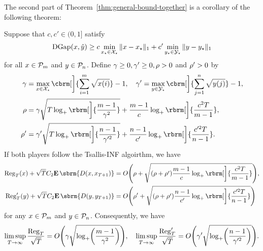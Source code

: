 The second part of Theorem~\ref{thm:general-bound-together}
is a corollary of the following theorem:
\begin{theorem}
	\label{thm:general-bound3}
    Suppose that $c, c'\in (0, 1]$ satisfy 
    \begin{align}
        \label{eq:LBDG}
        \operatorname{DGap}({x}, \hat{y})
        \ge
        c \min_{x_{\star} \in \mathcal{X}_{\star}}\| {x} - x_{\star} \|_1
        +
        c' \min_{y_{\star} \in \mathcal{Y}_{\star}} \| {y} - y_{\star}   \|_1
    \end{align}
    for all $x\in \mathcal{P}_m$ and $y \in \mathcal{P}_n$.
    Define
    $\gamma \ge 0, \gamma' \ge 0 , \rho > 0$ and
    $\rho' > 0$ by
    \begin{align}
        \label{eq:defgamma}
        \gamma
        &
        =
        \max_{x \in \NEr}
        \cbrm[\bigg]{
        \sum_{i = 1}^m
        \sqrt{x(i)}
        }
        -1
        ,
        \quad
        \gamma'
        =
        \max_{y \in \NEc}
        \cbrm[\bigg]{
        \sum_{j = 1}^n
        \sqrt{y(j)}
        }
        -1,
        \\
        \rhor 
        &
        = 
        \gamma\sqrt{T \log_+ \rbrm[\bigg]{ \frac{m-1}{\gamma^2} }} 
        +
        \frac{m-1}{c}
        \log_+\rbrm[\bigg]{
            \frac{c^2 T}{m-1}
        },
        \\
        \rhoc 
        &
        = 
        \gamma'\sqrt{T \log_+ \rbrm[\bigg]{\frac{n-1}{\gamma'^2} }} 
        +
        \frac{n-1}{c'}
        \log_+\rbrm[\bigg]{
            \frac{c'^2 T}{n-1}
        }.
    \end{align}
    If both players follow the Tsallis-INF algoirthm,
    we have
    \begin{align*}
    \Rr_T(x)
    +
    \sqrt{T}\constd{\E\sbrm{
        D(x, x_{T+1})
    }}
    &= O\mleft(\rhor + \sqrt{(\rhor + \rhoc)\frac{m-1}{c} \log_+ \rbrm[\bigg]{\frac{c^2T}{m-1} }}\mright),
    \\
    \Rc_T(y)
    +
    \sqrt{T}\constd{\E\sbrm{
        D(y, y_{T+1})
    }}
    &= O\mleft(\rhoc + \sqrt{(\rhor + \rhoc)\frac{n-1}{c'} \log_+ \rbrm[\bigg]{\frac{c'^2T}{n-1} }}\mright)
    \end{align*}
    for any $x \in \mathcal{P}_m$ and $y \in \mathcal{P}_n$.
    Consequently,
    we have
    \begin{align*}
        \limsup_{T \to \infty}
        \frac{\Rr_T}{\sqrt{T}}
        =
        O\mleft(
        \gamma\sqrt{\log_+ \mleft( \frac{m-1}{\gamma^2} \mright)} 
        \mright),
        \quad
        \limsup_{T \to \infty}
        \frac{\Rc_T}{\sqrt{T}}
        =
        O\mleft(
        \gamma'\sqrt{\log_+ \mleft( \frac{n-1}{\gamma'^2} \mright)} 
        \mright).
    \end{align*}
\end{theorem}
